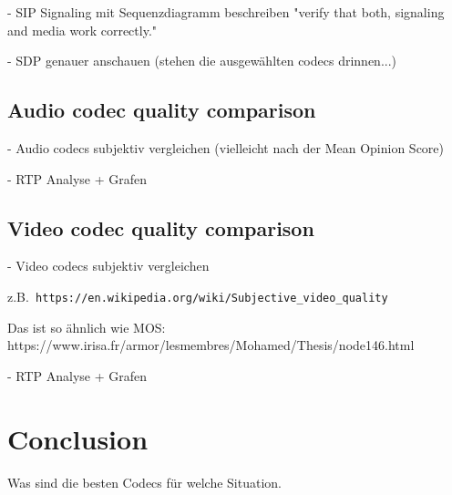 \documentclass[parskip=full]{scrartcl}
\begin{document}
- SIP Signaling mit Sequenzdiagramm beschreiben "verify that both, signaling and media work correctly."

- SDP genauer anschauen (stehen die ausgewählten codecs drinnen...)
\subsection{Audio codec quality comparison} \label{subsec:audio}
- Audio codecs subjektiv  vergleichen (vielleicht nach der Mean Opinion Score)

- RTP Analyse + Grafen
\subsection{Video codec quality comparison} \label{subsec:video}
- Video codecs subjektiv vergleichen  

z.B.\verb| https://en.wikipedia.org/wiki/Subjective_video_quality | 
  
Das ist so ähnlich wie MOS:
https://www.irisa.fr/armor/lesmembres/Mohamed/Thesis/node146.html

- RTP Analyse + Grafen
\section{Conclusion}

Was sind die besten Codecs für welche Situation. 

\printbibliography
\end{document}
